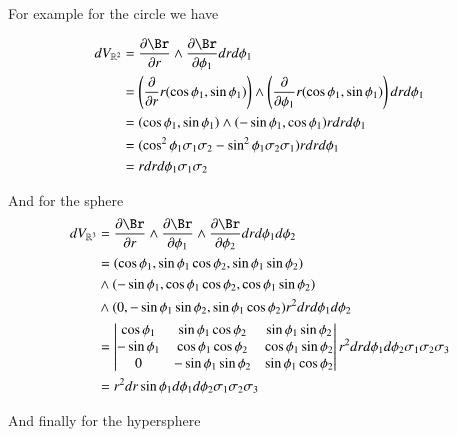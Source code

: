 \documentclass{article}
\begin{document}
For example for the circle we have

\begin{align*}
dV_{\Rm{2}}
&= \PD{r}{\Br} \wedge \PD{\phi_1}{\Br} dr d\phi_1 \\
&= \left(\PD{r}{}r(\cos\phi_1, \sin\phi_1) \right) \wedge \left(\PD{\phi_1}{}r(\cos\phi_1, \sin\phi_1) \right) dr d\phi_1 \\
&= (\cos\phi_1, \sin\phi_1) \wedge (-\sin\phi_1, \cos\phi_1) r dr d\phi_1 \\
&= (\cos^2\phi_1 \sigma_1 \sigma_2 - \sin^2\phi_1 \sigma_2 \sigma_1 ) r dr d\phi_1 \\
&= r dr d\phi_1 \sigma_1 \sigma_2 \\
\end{align*}

And for the sphere
\begin{align*}
dV_{\Rm{3}}
&= \PD{r}{\Br} \wedge \PD{\phi_1}{\Br} \wedge \PD{\phi_2}{\Br} dr d\phi_1 d\phi_2 \\
&= (\cos\phi_1, \sin\phi_1 \cos\phi_2, \sin\phi_1 \sin\phi_2)  \\
&\wedge (-\sin\phi_1, \cos\phi_1 \cos\phi_2, \cos\phi_1 \sin\phi_2)  \\
&\wedge (0, -\sin\phi_1 \sin\phi_2, \sin\phi_1 \cos\phi_2) r^2 dr d\phi_1 d\phi_2 \\
&= 
\begin{vmatrix}
\cos\phi_1 & \sin\phi_1 \cos\phi_2 & \sin\phi_1 \sin\phi_2  \\
-\sin\phi_1 & \cos\phi_1 \cos\phi_2 & \cos\phi_1 \sin\phi_2  \\
0 & -\sin\phi_1 \sin\phi_2 & \sin\phi_1 \cos\phi_2  \\
\end{vmatrix} r^2 dr d\phi_1 d\phi_2 \sigma_1 \sigma_2 \sigma_3 \\
&=
r^2 dr \sin\phi_1 d\phi_1 d\phi_2 \sigma_1 \sigma_2 \sigma_3 \\
\end{align*}

And finally for the hypersphere
\end{document}
